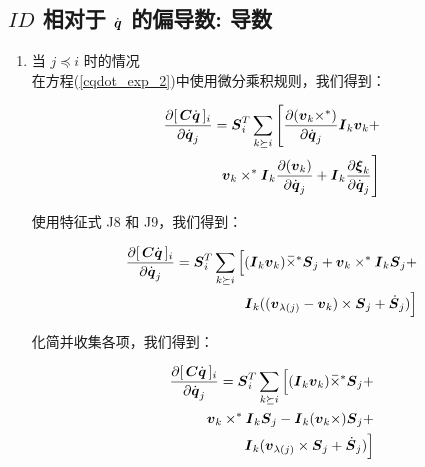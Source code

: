 \documentclass[letterpaper, 10 pt, conference]{ieeetran}  %
\begin{document}
{\begin{enumerate}
\end{enumerate}

\subsection{$ID$ 相对于 $\dot{\boldsymbol{q}}$ 的偏导数: 导数}
\label{partials_qd}

\begin{enumerate}
    \item 当 $j \preceq i$ 时的情况\\
    在方程(\ref{cqdot_exp_2})中使用微分乘积规则，我们得到：

  \begin{equation}
      \begin{aligned}
        \frac{\partial  [\,\C \qd\,]_{i}}{\partial \qd_{j}} =   \Phibar_{i}^{T}  \sum_{k \succeq i} \Bigg[\frac{\partial (\v_{k} \times^*)}{\partial \qd_{j}} \I_{k} \v_{k} + \\
         \v_{k} \times^* \I_{k} \frac{ \partial (\v_{k})}{\partial \qd_{j}} +  \I_{k} \frac{\partial \xibar_{k} }{\partial \qd_{j}} \Bigg]  
        \label{partial_Cqdot_dot_1}
      \end{aligned}
\end{equation}

使用特征式 J8 和 J9，我们得到：

\begin{equation}
      \begin{aligned}
        \frac{\partial  [\,\C \qd\,]_{i}}{\partial \qd_{j}} =   \Phibar_{i}^{T}  \sum_{k \succeq i} \Big[(\I_{k} \v_{k}) \crff \Phibar_{j} 
        + \v_{k} \times^* \I_{k} \Phibar_{j} + \\
        \I_{k} ( (\v_{\lambda(j)} - \v_{k})  \times \Phibar_{j} + \Phibardot_{j} ) \Big]  
        \label{partial_Cqdot_dot_2}
      \end{aligned}
\end{equation}


化简并收集各项，我们得到：

  \begin{equation}
      \begin{aligned}
        \frac{\partial  [\,\C \qd\,]_{i}}{\partial \qd_{j}} =   \Phibar_{i}^{T}  \sum_{k \succeq i} \Big[(\I_{k} \v_{k}) \crff \Phibar_{j}  + \\ \v_{k} \times^* \I_{k} \Phibar_{j}  -
        \I_{k}(\v_{k} \times) \Phibar_{j} +\\
        \I_{k} (\v_{\lambda(j)}  \times \Phibar_{j} +  \Phibardot_{j} ) \Big]  
        \label{partial_Cqdot_dot_3}
      \end{aligned}
\end{equation}


\end{enumerate}}
\end{document}
